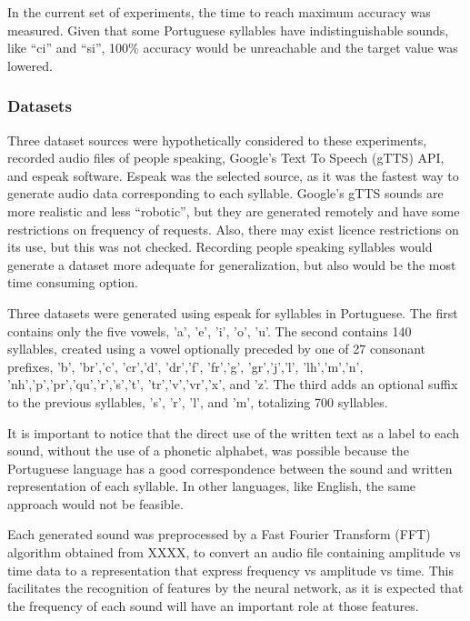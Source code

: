 In the current set of experiments, the time to reach maximum accuracy was measured. Given that some Portuguese syllables have indistinguishable sounds, like ``ci'' and ``si'', 100\% accuracy would be unreachable and the target value was lowered.

\subsubsection{Datasets}
Three dataset sources were hypothetically considered to these experiments, recorded audio files of people speaking, Google's Text To Speech (gTTS) API, and espeak software. Espeak was the selected source, as it was the fastest way to generate audio data corresponding to each syllable. Google's gTTS sounds are more realistic and less ``robotic'', but they are generated remotely and have some restrictions on frequency of requests. Also, there may exist licence restrictions on its use, but this was not checked. Recording people speaking syllables would generate a dataset more adequate for generalization, but also would be the most time consuming option.

Three datasets were generated using espeak for syllables in Portuguese. The first contains only the five vowels, 'a', 'e', 'i', 'o', 'u'. The second contains 140 syllables, created using a vowel optionally preceded by one of 27 consonant prefixes, 'b', 'br','c', 'cr','d', 'dr','f', 'fr','g', 'gr','j','l', 'lh','m','n', 'nh','p','pr','qu','r','s','t', 'tr','v','vr','x', and 'z'.
The third adds an optional suffix to the previous syllables, 's', 'r', 'l', and 'm', totalizing 700 syllables.

It is important to notice that the direct use of the written text as a label to each sound, without the use of a phonetic alphabet, was possible because the Portuguese language has a good correspondence between the sound and written representation of each syllable. In other languages, like English, the same approach would not be feasible.

Each generated sound was preprocessed by a Fast Fourier Transform (FFT) algorithm obtained from XXXX,
to convert an audio file containing amplitude vs time data to a representation that express frequency vs amplitude vs time. This facilitates the recognition of features by the neural network, as it is expected that the frequency of each sound will have an important role at those features.

